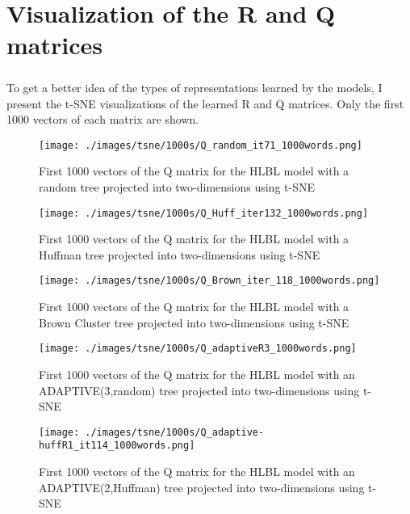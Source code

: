 
\chapter{Visualization of the R and Q matrices}
\paragraph{}
To get a better idea of the types of representations learned by the models, I present the t-SNE visualizations of the learned R and Q matrices. Only the first 1000 vectors of each matrix are shown.

\begin{figure}[h]
\texttt{[image: ./images/tsne/1000s/Q\_random\_it71\_1000words.png]} 
\centering
\caption{First 1000 vectors of the Q matrix for the HLBL model with a random tree projected into two-dimensions using t-SNE}
\end{figure}

\begin{figure}[h]
\texttt{[image: ./images/tsne/1000s/Q\_Huff\_iter132\_1000words.png]} 
\centering
\caption{First 1000 vectors of the Q matrix for the HLBL model with a Huffman tree projected into two-dimensions using t-SNE}
\end{figure}

\begin{figure}[h]
\texttt{[image: ./images/tsne/1000s/Q\_Brown\_iter\_118\_1000words.png]} 
\centering
\caption{First 1000 vectors of the Q matrix for the HLBL model with a Brown Cluster tree projected into two-dimensions using t-SNE}
\end{figure}

\begin{figure}[h]
\texttt{[image: ./images/tsne/1000s/Q\_adaptiveR3\_1000words.png]} 
\centering
\caption{First 1000 vectors of the Q matrix for the HLBL model with an ADAPTIVE(3,random) tree projected into two-dimensions using t-SNE}
\end{figure}

\begin{figure}[h]
\texttt{[image: ./images/tsne/1000s/Q\_adaptive-huffR1\_it114\_1000words.png]} 
\centering
\caption{First 1000 vectors of the Q matrix for the HLBL model with an ADAPTIVE(2,Huffman) tree projected into two-dimensions using t-SNE}
\end{figure}

